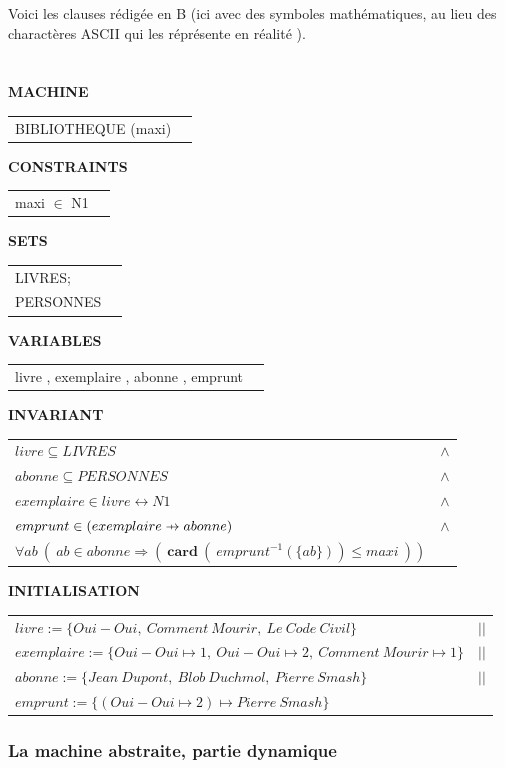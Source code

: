 \documentclass[10pt,a4paper]{article}
\def\p#1{\mathrel{\ooalign{\hfil$\mapstochar\mkern 5mu$\hfil\cr$#1$}}}
\def \pfun  {\p\rightarrow}
\begin{document}
Voici les clauses rédigée en B (ici avec des symboles mathématiques, au lieu des charactères ASCII qui les réprésente en réalité \cite[p. 29]{introB}).
\\
\\
\\
\setlength{\LTpre}{\medskipamount} %
\setlength{\LTpost}{0pt}
\setlength\LTleft{\parindent}
\textbf{MACHINE}
\begin{longtable}{ll} BIBLIOTHEQUE (maxi) \end{longtable}
\noindent\textbf{CONSTRAINTS}
\begin{longtable}{ll} maxi $\in$ N1 \end{longtable}
\noindent\textbf{SETS}
\begin{longtable}{ll} LIVRES; \\ PERSONNES\\ \end{longtable}
\noindent\textbf{VARIABLES}
\begin{longtable}{ll} livre , exemplaire , abonne , emprunt \end{longtable}
\noindent\textbf{INVARIANT}
\begin{longtable}{ll}
$livre \subseteq LIVRES $ & $\wedge$ \tabularnewline
$abonne \subseteq PERSONNES$ & $\wedge$ \tabularnewline
$exemplaire \in livre \leftrightarrow N1$ & $\wedge$ \tabularnewline
$emprunt \in ( exemplaire \pfun abonne )$ & $\wedge$ \tabularnewline
$\forall ab\ (\ ab \in abonne \Rightarrow (\ \textbf{card}\ (\ emprunt ^{-1}(\{ab\})) \leq maxi\ ))$ &
\end{longtable}
\noindent\textbf{INITIALISATION}
\begin{longtable}{ll}
$livre := \{Oui-Oui,\ Comment\ Mourir,\ Le\ Code\ Civil\} $& $||$ \tabularnewline
$exemplaire := \{Oui-Oui \mapsto 1,\ Oui-Oui \mapsto 2,\ Comment\ Mourir \mapsto 1\}$ & $||$ \tabularnewline
$abonne := \{Jean\ Dupont,\ Blob\ Duchmol,\ Pierre\ Smash\} $& $||$ \tabularnewline
$emprunt := \{( Oui-Oui \mapsto 2)  \mapsto Pierre\ Smash \}$ &
\end{longtable}

\subsubsection{La machine abstraite, partie dynamique}
\end{document}
